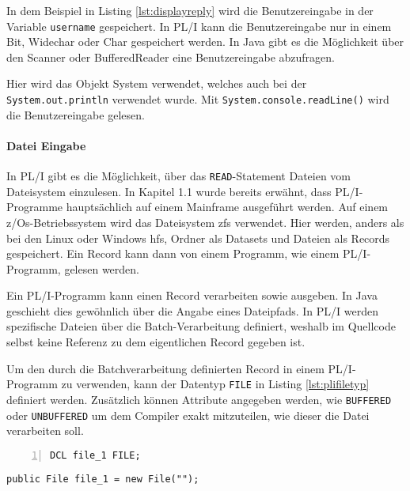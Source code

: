 In dem Beispiel in Listing \ref{lst:displayreply} wird die Benutzereingabe in der
Variable \verb+username+ gespeichert.
In PL/I kann die Benutzereingabe nur in einem Bit, Widechar oder Char gespeichert werden. 
In Java gibt es die Möglichkeit über den Scanner oder BufferedReader eine Benutzereingabe abzufragen.

Hier wird das Objekt System verwendet, welches auch bei der \verb+System.out.println+ verwendet wurde.
Mit \verb+System.console.readLine()+ wird die Benutzereingabe gelesen.

\paragraph*{Datei Eingabe}
In PL/I gibt es die Möglichkeit, über das \verb+READ+-Statement Dateien vom Dateisystem einzulesen.
In Kapitel 1.1 wurde bereits erwähnt, dass PL/I-Programme hauptsächlich auf einem Mainframe ausgeführt werden.
Auf einem z/Os-Betriebssystem wird das Dateisystem \ac{zfs} verwendet.
Hier werden, anders als bei den  Linux oder Windows \ac{hfs}, Ordner als Datasets und Dateien als Records gespeichert.
Ein Record kann dann von einem Programm, wie einem PL/I-Programm, gelesen werden.

Ein PL/I-Programm kann einen Record verarbeiten sowie ausgeben. In Java geschieht dies gewöhnlich über die Angabe eines Dateipfads.
In PL/I werden spezifische Dateien über die Batch-Verarbeitung definiert, weshalb im Quellcode selbst keine Referenz zu dem eigentlichen Record gegeben ist.

Um den durch die Batchverarbeitung definierten Record in einem PL/I-Programm zu verwenden, kann der Datentyp \verb+FILE+ in Listing \ref{lst:plifiletyp} definiert werden. Zusätzlich können Attribute angegeben werden, wie \verb+BUFFERED+ oder \verb+UNBUFFERED+ um dem Compiler exakt mitzuteilen, wie dieser die Datei verarbeiten soll.

\begin{minipage}[b]{0.48\linewidth}
	\centering
	\lstset{language=PL/I,label=SliceExaple}
	\begin{lstlisting}[frame=single, numbers=left, mathescape,%
		caption={Transformation Dateityp}, label={lst:plifiletyp}]
 DCL file_1 FILE;
	\end{lstlisting}
\end{minipage}
\hspace{0.5cm}
\begin{minipage}[b]{0.48\linewidth}
	\centering
	\lstset{language=Java,label=SliceExaple}
	\begin{lstlisting}[frame=single, mathescape,%
		title={" "}]
 public File file_1 = new File("");
	\end{lstlisting}
\end{minipage}  

